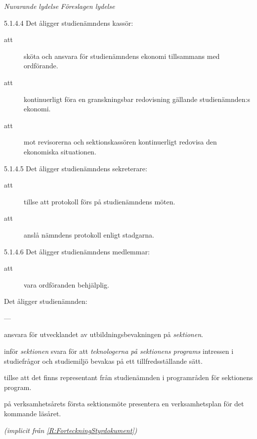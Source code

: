\documentclass{article}
\newenvironment{lydelse}
    {\begin{paracol}{2}%
        \emph{Nuvarande lydelse}%
        \switchcolumn%
        \emph{Föreslagen lydelse}%
    \end{paracol}%
    \begin{enumerate}[label=\thesubsection.\arabic*]%
    \begin{paracol}{2}%
    }{\end{paracol}\end{enumerate}}
\begin{document}
\begin{lydelse}
    \item[5.1.4.4] Det åligger studienämndens kassör:
	\begin{description}
		\item[att] sköta och ansvara för studienämndens ekonomi tillsammans med ordförande.
		\item[att] kontinuerligt föra en granskningsbar redovisning gällande studienämnden:s ekonomi.
		\item[att] mot revisorerna och sektionskassören kontinuerligt redovisa den ekonomiska situationen. 
	\end{description}

    \item[5.1.4.5] Det åligger studienämndens sekreterare:
	\begin{description}
 		\item[att] tillse att protokoll förs på studienämndens möten.
		\item[att] anslå nämndens protokoll enligt stadgarna.
	\end{description}

    \item[5.1.4.6] Det åligger studienämndens medlemmar:
	\begin{description}
		\item[att] vara ordföranden behjälplig.
	\end{description}
	\setcounter{section}{4}
    \switchcolumn
    \setcounter{enumi}{0}
    
    \item Det åligger studienämnden:
    \begin{aligganden}
        \item[] --- \vspace{1.2em}
        \item ansvara för utvecklandet av utbildningsbevakningen på \emph{sektionen}.
        \item inför \emph{sektionen} svara för att \emph{teknologerna på sektionens programs} intressen i studiefrågor och studiemiljö bevakas på ett tillfredsställande sätt.\vspace{0.2em}
        \item tillse att det finns representant från studienämnden i programråden för sektionens program.\vspace{0.2em}
        \item på verksamhetsårets första sektionsmöte presentera en verksamhetsplan för det kommande läsåret.\vspace{0.2em}
        \item[] \emph{(implicit från \ref{R:ForteckningStyrdokument})}
    \end{aligganden}
    

\end{lydelse}
\end{document}
